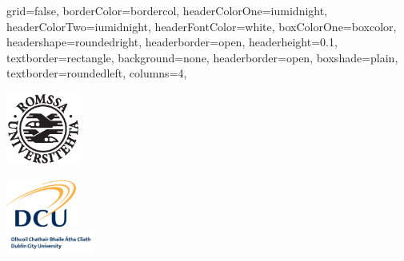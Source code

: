 \documentclass[fontscale=0.33,landscape,paperwidth=48in,paperheight=36in]{baposter}  %
\begin{document}
	\setlength{\pdfpageheight}{\paperheight}
	\setlength{\pdfpagewidth}{\paperwidth}


	\begin{poster}{
		grid=false,
		borderColor=bordercol,
		headerColorOne=iumidnight,
		headerColorTwo=iumidnight,
		headerFontColor=white,
		boxColorOne=boxcolor,
		headershape=roundedright,
		headerborder=open,
		headerheight=0.1\textheight,
		textborder=rectangle,
		background=none,
		headerborder=open,
		boxshade=plain,
		textborder=roundedleft,
		columns=4,
	}{ %
		\includegraphics[height=6.5em]{uitlogo}
		\hspace{2.5cm}\begin{minipage}[t]{7em}
			\vspace{-2cm}
			\noindent\includegraphics[height=4.2em]{DCU_logo_2col}\\
			\vspace{-0.5ex}\hspace{0.105cm}\includegraphics[height=2.15em]{DCU_2010_Name_Mark_289}
		\end{minipage}

}
\end{poster}
\end{document}
